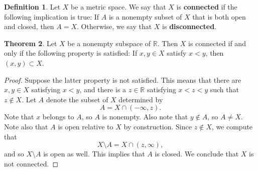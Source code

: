 \documentclass[12pt]{article}
\theoremstyle{definition}
\newtheorem{definition}{Definition}
\theoremstyle{theorem}
\newtheorem{theorem}[definition]{Theorem}
\begin{document}
\begin{definition}
Let $X$ be a metric space. We say that $X$ is \textbf{connected} if the following implication is true: If $A$ is a nonempty subset of $X$ that is both open and closed, then $A = X$. Otherwise, we say that $X$ is \textbf{disconnected}. 
\end{definition}

\begin{theorem}\label{thm:connectedinR}
Let $X$ be a nonempty subspace of $\mathbb{R}$. Then $X$ is connected if and only if the following property is satisfied: If $x,y \in X$ satisfy $x < y$, then $(x,y) \subset X$. 
\end{theorem}

\begin{proof}
Suppose the latter property is not satisfied. This means that there are $x,y \in X$ satisfying $x < y$, and there is a $z \in \mathbb{R}$ satisfying $x < z < y$ such that $z \notin X$. Let $A$ denote the subset of $X$ determined by 
\[
A = X \cap (-\infty, z).
\]
Note that $x$ belongs to $A$, so $A$ is nonempty. Also note that $y \notin A$, so $A \neq X$. Note also that $A$ is open relative to $X$ by construction. Since $z \notin X$, we compute that  
\[
X \setminus A = X \cap (z, \infty),
\]
and so $X \setminus A$ is open as well. This implies that $A$ is closed. We conclude that $X$ is not connected. 


\end{proof}
\end{document}
